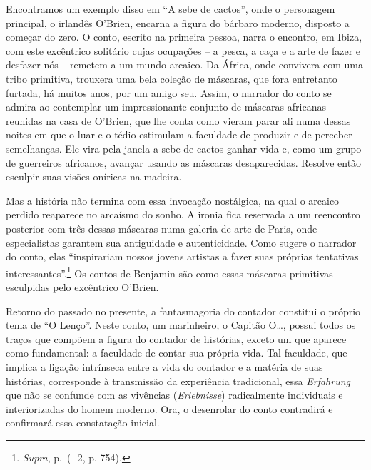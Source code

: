 Encontramos um exemplo disso em ``A sebe de cactos'', onde o personagem
principal, o irlandês O'Brien, encarna a figura do bárbaro moderno,
disposto a começar do zero. O conto, escrito na primeira pessoa, narra o
encontro, em Ibiza, com este excêntrico solitário cujas ocupações -- a
pesca, a caça e a arte de fazer e desfazer nós -- remetem a um mundo
arcaico. Da África, onde convivera com uma tribo primitiva, trouxera uma
bela coleção de máscaras, que fora entretanto furtada, há muitos anos,
por um amigo seu. Assim, o narrador do conto se admira ao contemplar um
impressionante conjunto de máscaras africanas reunidas na casa de
O'Brien, que lhe conta como vieram parar ali numa dessas noites em que o
luar e o tédio estimulam a faculdade de produzir e de perceber
semelhanças. Ele vira pela janela a sebe de cactos ganhar vida e, como
um grupo de guerreiros africanos, avançar usando as máscaras
desaparecidas. Resolve então esculpir suas visões oníricas na madeira.

Mas a história não termina com essa invocação nostálgica, na qual o
arcaico perdido reaparece no arcaísmo do sonho. A ironia fica reservada
a um reencontro posterior com três dessas máscaras numa galeria de arte
de Paris, onde especialistas garantem sua antiguidade e autenticidade.
Como sugere o narrador do conto, elas ``inspirariam nossos jovens artistas a
fazer suas próprias tentativas interessantes''.\footnote{\emph{Supra},
  p.\,\pageref{supra8} ( -2, p. 754).} Os contos de Benjamin são como essas máscaras
primitivas esculpidas pelo excêntrico O'Brien.

Retorno do passado no presente, a fantasmagoria do contador constitui o
próprio tema de ``O Lenço''. Neste conto, um marinheiro, o Capitão O\ldots{},
possui todos os traços que compõem a figura do contador de histórias,
exceto um que aparece como fundamental: a faculdade de contar sua
própria vida. Tal faculdade, que implica a ligação intrínseca entre a
vida do contador e a matéria de suas histórias, corresponde à
transmissão da experiência tradicional, essa \emph{Erfahrung} que não se
confunde com as vivências (\emph{Erlebnisse}) radicalmente individuais e
interiorizadas do homem moderno. Ora, o desenrolar do conto contradirá e
confirmará essa constatação inicial.


